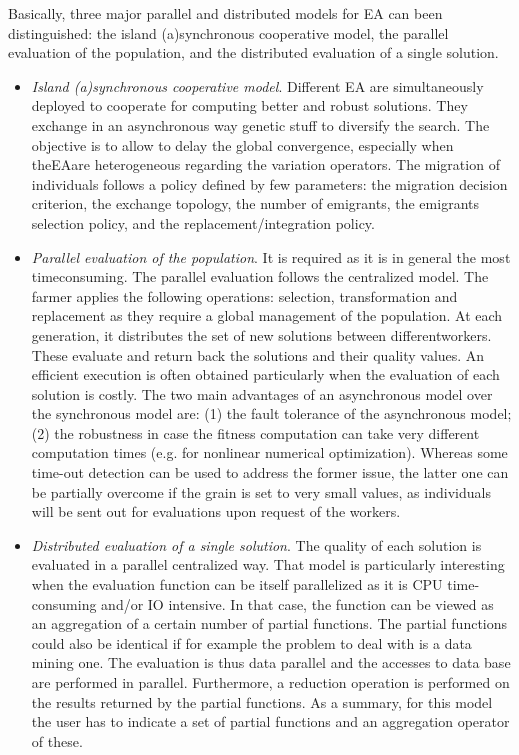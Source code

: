 Basically, three major parallel and distributed models for EA can been distinguished: the island (a)synchronous cooperative model, the parallel evaluation of the population, and the distributed evaluation of a single solution. \begin{itemize}
\item {\em Island (a)synchronous cooperative model\/}. Different EA are simultaneously deployed to cooperate for computing better and robust solutions. They exchange in an asynchronous way genetic stuff to diversify the search. The objective is to allow to delay the global convergence, especially when the\-EAare heterogeneous regarding the variation operators. The migration of individuals follows a policy defined by few parameters: the migration decision criterion, the exchange topology, the number of emigrants, the emigrants selection policy, and the replacement/integration policy.

\item {\em Parallel evaluation of the population\/}. It is required as it is in general the most timeconsuming. The parallel evaluation follows the centralized model. The farmer applies the following operations: selection, transformation and replacement as they require a global management of the population. At each generation, it distributes the set of new solutions between differentworkers. These evaluate and return back the solutions and their quality values. An efficient execution is often obtained particularly when the evaluation of each solution is costly. The two main advantages of an asynchronous model over the synchronous model are: (1) the fault tolerance of the asynchronous model; (2) the robustness in case the fitness computation can take very different computation times (e.g. for nonlinear numerical optimization). Whereas some time-out detection can be used to address the former issue, the latter one can be partially overcome if the grain is set to very small values, as individuals will be sent out for evaluations upon request of the workers.

\item {\em Distributed evaluation of a single solution\/}. The quality of each solution is evaluated in a parallel centralized way. That model is particularly interesting when the evaluation function can be itself parallelized as it is CPU time-consuming and/or IO intensive. In that case, the function can be viewed as an aggregation of a certain number of partial functions. The partial functions could also be identical if for example the problem to deal with is a data mining one. The evaluation is thus data parallel and the accesses to data base are performed in parallel. Furthermore, a reduction operation is performed on the results returned by the partial functions. As a summary, for this model the user has to indicate a set of partial functions and an aggregation operator of these. \end{itemize}
